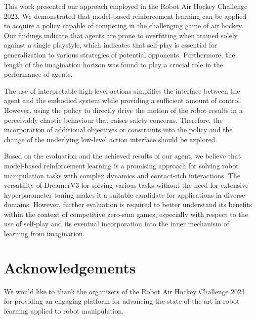 \documentclass{article}
\begin{document}
This work presented our approach employed in the Robot Air Hockey Challenge 2023. We demonstrated that model-based reinforcement learning can be applied to acquire a policy capable of competing in the challenging game of air hockey. Our findings indicate that agents are prone to overfitting when trained solely against a single playstyle, which indicates that self-play is essential for generalization to various strategies of potential opponents. Furthermore, the length of the imagination horizon was found to play a crucial role in the performance of agents.

The use of interpretable high-level actions simplifies the interface between the agent and the embodied system while providing a sufficient amount of control. However, using the policy to directly drive the motion of the robot results in a perceivably chaotic behaviour that raises safety concerns. Therefore, the incorporation of additional objectives or constraints into the policy and the change of the underlying low-level action interface should be explored.

Based on the evaluation and the achieved results of our agent, we believe that model-based reinforcement learning is a promising approach for solving robot manipulation tasks with complex dynamics and contact-rich interactions. The versatility of DreamerV3 for solving various tasks without the need for extensive hyperparameter tuning makes it a suitable candidate for applications in diverse domains. However, further evaluation is required to better understand its benefits within the context of competitive zero-sum games, especially with respect to the use of self-play and its eventual incorporation into the inner mechanism of learning from imagination.

\section*{Acknowledgements}\label{sec:acknowledgements}

We would like to thank the organizers of the Robot Air Hockey Challenge 2023 for providing an engaging platform for advancing the state-of-the-art in robot learning applied to robot manipulation.
\end{document}
